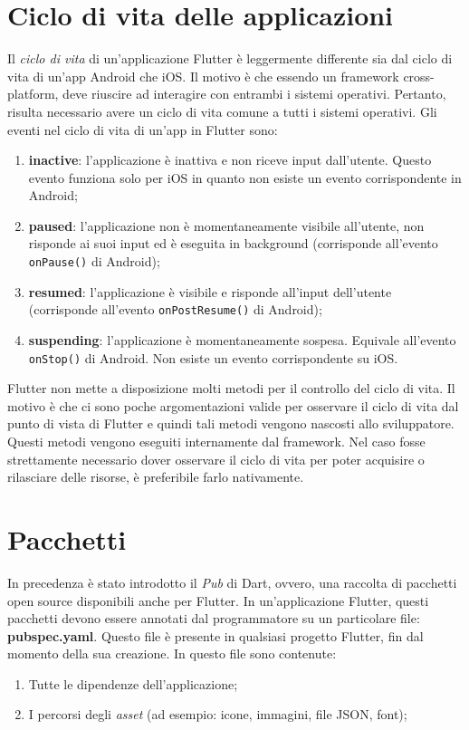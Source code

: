\section{Ciclo di vita delle applicazioni}
Il \textit{ciclo di vita} di un'applicazione Flutter è leggermente differente sia dal ciclo di vita di un'app Android che iOS. Il motivo è che essendo un framework cross-platform, deve riuscire ad interagire con entrambi i sistemi operativi. Pertanto, risulta necessario avere un ciclo di vita comune a tutti i sistemi operativi. Gli eventi nel ciclo di vita di un'app in Flutter sono:
\begin{enumerate}
	\item \textbf{inactive}: l’applicazione è inattiva e non riceve input dall’utente. Questo evento funziona solo per iOS in quanto non esiste un evento corrispondente in Android;
	\item \textbf{paused}: l’applicazione non è momentaneamente visibile all’utente, non risponde ai suoi input ed è eseguita in background (corrisponde all'evento \verb|onPause()| di Android);
	\item \textbf{resumed}: l’applicazione è visibile e risponde all’input dell’utente (corrisponde all'evento \verb|onPostResume()| di Android);
	\item \textbf{suspending}: l’applicazione è momentaneamente sospesa. Equivale all'evento \verb|onStop()| di Android. Non esiste un evento corrispondente su iOS.
\end{enumerate}

Flutter non mette a disposizione molti metodi per il controllo del ciclo di vita. Il motivo è che ci sono poche argomentazioni valide per osservare il ciclo di vita dal punto di vista di Flutter e quindi tali metodi vengono nascosti allo sviluppatore. Questi metodi vengono eseguiti internamente dal framework. Nel caso fosse strettamente necessario dover osservare il ciclo di vita per poter acquisire o rilasciare delle risorse, è preferibile farlo nativamente.

\section{Pacchetti}
In precedenza è stato introdotto il \textit{Pub} di Dart, ovvero, una raccolta di pacchetti open source disponibili anche per Flutter. In un'applicazione Flutter, questi pacchetti devono essere annotati dal programmatore su un particolare file: \textbf{pubspec.yaml}. Questo file è presente in qualsiasi progetto Flutter, fin dal momento della sua creazione. In questo file sono contenute:
\begin{enumerate}
	\item Tutte le dipendenze dell'applicazione;
	\item I percorsi degli \textit{asset} (ad esempio: icone, immagini, file JSON, font);
\end{enumerate}

